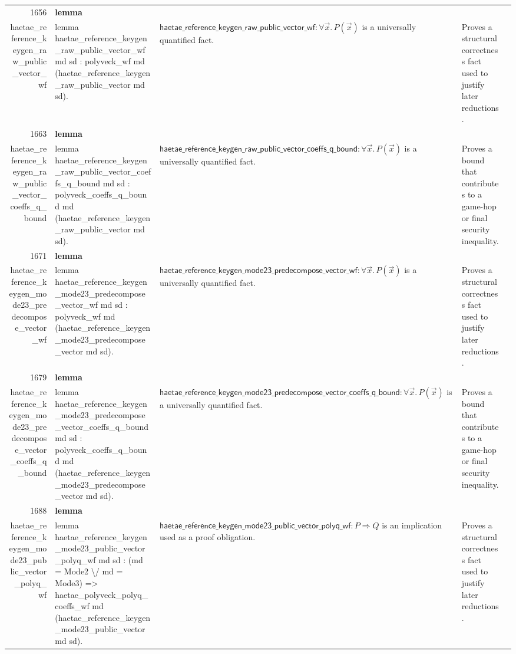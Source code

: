 \documentclass[10pt]{article}
\newcommand{\ec}[1]{\begingroup\ttfamily\scriptsize #1\endgroup}
\begin{document}
\begin{longtable}{r L{0.17\textwidth} L{0.26\textwidth} L{0.27\textwidth} L{0.20\textwidth}}
1656 & \textbf{lemma}\\\ec{haetae\_reference\_keygen\_raw\_public\_vector\_wf} & \ec{lemma haetae\_reference\_keygen\_raw\_public\_vector\_wf md sd : polyveck\_wf md (haetae\_reference\_keygen\_raw\_public\_vector md sd).} & \(\mathsf{haetae\_reference\_keygen\_raw\_public\_vector\_wf} : \forall \vec{x}.\, P(\vec{x})\) is a universally quantified fact. & Proves a structural correctness fact used to justify later reductions. \\
1663 & \textbf{lemma}\\\ec{haetae\_reference\_keygen\_raw\_public\_vector\_coeffs\_q\_bound} & \ec{lemma haetae\_reference\_keygen\_raw\_public\_vector\_coeffs\_q\_bound md sd : polyveck\_coeffs\_q\_bound md (haetae\_reference\_keygen\_raw\_public\_vector md sd).} & \(\mathsf{haetae\_reference\_keygen\_raw\_public\_vector\_coeffs\_q\_bound} : \forall \vec{x}.\, P(\vec{x})\) is a universally quantified fact. & Proves a bound that contributes to a game-hop or final security inequality. \\
1671 & \textbf{lemma}\\\ec{haetae\_reference\_keygen\_mode23\_predecompose\_vector\_wf} & \ec{lemma haetae\_reference\_keygen\_mode23\_predecompose\_vector\_wf md sd : polyveck\_wf md (haetae\_reference\_keygen\_mode23\_predecompose\_vector md sd).} & \(\mathsf{haetae\_reference\_keygen\_mode23\_predecompose\_vector\_wf} : \forall \vec{x}.\, P(\vec{x})\) is a universally quantified fact. & Proves a structural correctness fact used to justify later reductions. \\
1679 & \textbf{lemma}\\\ec{haetae\_reference\_keygen\_mode23\_predecompose\_vector\_coeffs\_q\_bound} & \ec{lemma haetae\_reference\_keygen\_mode23\_predecompose\_vector\_coeffs\_q\_bound md sd : polyveck\_coeffs\_q\_bound md (haetae\_reference\_keygen\_mode23\_predecompose\_vector md sd).} & \(\mathsf{haetae\_reference\_keygen\_mode23\_predecompose\_vector\_coeffs\_q\_bound} : \forall \vec{x}.\, P(\vec{x})\) is a universally quantified fact. & Proves a bound that contributes to a game-hop or final security inequality. \\
1688 & \textbf{lemma}\\\ec{haetae\_reference\_keygen\_mode23\_public\_vector\_polyq\_wf} & \ec{lemma haetae\_reference\_keygen\_mode23\_public\_vector\_polyq\_wf md sd : (md = Mode2 \textbackslash{}/ md = Mode3) => haetae\_polyveck\_polyq\_coeffs\_wf md (haetae\_reference\_keygen\_mode23\_public\_vector md sd).} & \(\mathsf{haetae\_reference\_keygen\_mode23\_public\_vector\_polyq\_wf} : P \Rightarrow Q\) is an implication used as a proof obligation. & Proves a structural correctness fact used to justify later reductions. \\

\end{longtable}
\end{document}
